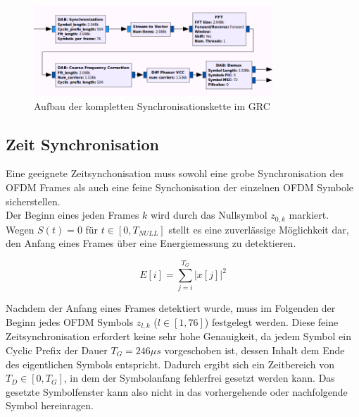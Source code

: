 \begin{figure}[h]
\centering
  \includegraphics[width=0.8\textwidth]{figures/sync_hier_block.png}
	\caption{Aufbau der kompletten Synchronisationskette im \ac{GRC}}
	\label{fig:sync_overview}
\end{figure}

\subsection{Zeit Synchronisation}
\label{sec:time_sync}
Eine geeignete Zeitsynchonisation muss sowohl eine grobe Synchronisation des OFDM Frames als auch eine feine Synchonisation der einzelnen OFDM Symbole sicherstellen. \\

Der Beginn eines jeden Frames $ k $ wird durch das Nullsymbol $z_{0,k}$ markiert. Wegen $S(t) = 0$ für $t \in [0, T_{NULL}]$ stellt es eine zuverlässige Möglichkeit dar, den Anfang eines Frames über eine Energiemessung zu detektieren.

\begin{equation}
E[i] = \sum \limits_{j=i}^{T_G}|x[j]|^2
\label{eq:energy}
\end{equation}

Nachdem der Anfang eines Frames detektiert wurde, muss im Folgenden der Beginn jedes OFDM Symbols $z_{l,k}$ ($l \in [1, 76]$) festgelegt werden. Diese feine Zeitsynchronisation erfordert keine sehr hohe Genauigkeit, da jedem Symbol ein Cyclic Prefix der Dauer $T_G = 246 \mu s $ vorgeschoben ist, dessen Inhalt dem Ende des eigentlichen Symbols entspricht. Dadurch ergibt sich ein Zeitbereich von  $T_D \in [0,T_G]$, in dem der Symbolanfang fehlerfrei gesetzt werden kann. Das gesetzte Symbolfenster kann also nicht in das vorhergehende oder nachfolgende Symbol hereinragen.

